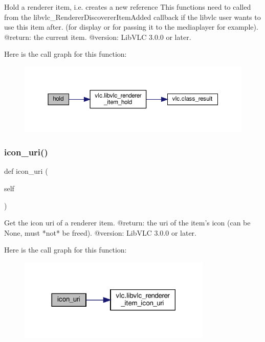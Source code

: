 \begin{DoxyVerb}Hold a renderer item, i.e. creates a new reference
This functions need to called from the libvlc_RendererDiscovererItemAdded
callback if the libvlc user wants to use this item after. (for display or
for passing it to the mediaplayer for example).
@return: the current item.
@version: LibVLC 3.0.0 or later.
\end{DoxyVerb}
 Here is the call graph for this function\+:
\nopagebreak
\begin{figure}[H]
\begin{center}
\leavevmode
\includegraphics[width=350pt]{classvlc_1_1_renderer_a3d005406da2434646eee68e2f7175b35_cgraph}
\end{center}
\end{figure}
\mbox{\label{classvlc_1_1_renderer_a879c6fc8fa45e9dee1502bcc1379924e}} 
\subsubsection{\texorpdfstring{icon\+\_\+uri()}{icon\_uri()}}
{\footnotesize\ttfamily def icon\+\_\+uri (\begin{DoxyParamCaption}\item[{}]{self }\end{DoxyParamCaption})}

\begin{DoxyVerb}Get the icon uri of a renderer item.
@return: the uri of the item's icon (can be None, must *not* be freed).
@version: LibVLC 3.0.0 or later.
\end{DoxyVerb}
 Here is the call graph for this function\+:
\nopagebreak
\begin{figure}[H]
\begin{center}
\leavevmode
\includegraphics[width=261pt]{classvlc_1_1_renderer_a879c6fc8fa45e9dee1502bcc1379924e_cgraph}
\end{center}
\end{figure}
\mbox{\label{classvlc_1_1_renderer_a5907ca3bbf8e7cd8f40c3007338f6d02}} 

